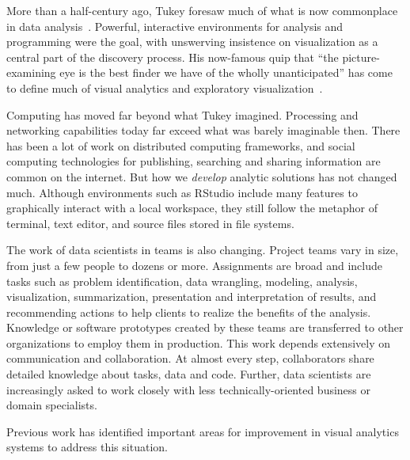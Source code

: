 
\maketitle

More than a half-century ago, Tukey foresaw
much of what is now commonplace in data analysis~\cite{TukeyFDA}.
Powerful, interactive environments for analysis and programming were
the goal, with unswerving insistence on visualization as a
central part of the discovery process. His now-famous quip that
``the picture-examining eye is the best finder we have of the
wholly unanticipated'' has come to define much of visual analytics
and exploratory visualization~\cite{TukeyEDA}.

Computing has moved far beyond what Tukey imagined.
Processing and networking capabilities today far exceed
what was barely imaginable then. There has been a lot of
work on distributed computing frameworks, and social computing
technologies for publishing, searching and sharing information
are common on the internet.
But how we \emph{develop} analytic solutions has not changed much. 
Although environments such as RStudio include many features to
graphically interact with a local workspace, they still follow the
metaphor of terminal, text editor, and source files stored in file systems.

The work of data scientists in teams is also changing.
Project teams vary in size, from just a few people to dozens or
more.
Assignments are broad and include tasks such as problem identification,
data wrangling, modeling, analysis, visualization, summarization,
presentation and interpretation of results, and recommending
actions to help clients to realize the benefits of the analysis.
Knowledge or software prototypes created by these teams are transferred
to other organizations to employ them in production.
This work depends extensively on communication and collaboration.
At almost every step, collaborators share detailed knowledge about tasks,
data and code.
Further, data scientists are increasingly asked to work closely
with less technically-oriented business or domain specialists.

Previous work has identified important areas for improvement in
visual analytics systems to address this situation.


